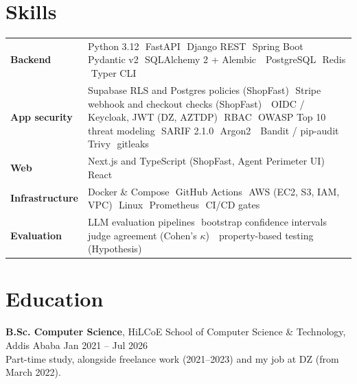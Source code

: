\documentclass[10pt,letterpaper]{article}
\newcommand{\sep}{\,\textperiodcentered\,}
\begin{document}
\section{Skills}
{\small{}
\begin{tabularx}{\linewidth}{@{}>{\RaggedRight}p{2.85cm}>{\RaggedRight\arraybackslash}X@{}}
\textbf{Backend} & Python 3.12 \sep FastAPI \sep Django REST \sep Spring Boot \sep Pydantic v2 \sep SQLAlchemy 2 + Alembic \sep
PostgreSQL \sep Redis \sep Typer CLI \\[1pt]
\textbf{App security} & Supabase RLS and Postgres policies (ShopFast) \sep Stripe webhook and checkout checks (ShopFast) \sep
OIDC / Keycloak, JWT (DZ, AZTDP) \sep RBAC \sep OWASP Top 10 \sep threat modeling \sep SARIF 2.1.0 \sep Argon2 \sep
Bandit / pip-audit \sep Trivy \sep gitleaks \\[1pt]
\textbf{Web} & Next.js and TypeScript (ShopFast, Agent Perimeter UI) \sep React \\[1pt]
\textbf{Infrastructure} & Docker \& Compose \sep GitHub Actions \sep AWS (EC2, S3, IAM, VPC) \sep Linux \sep Prometheus \sep CI/CD gates \\[1pt]
\textbf{Evaluation} & LLM evaluation pipelines \sep bootstrap confidence intervals \sep judge agreement (Cohen's $\kappa$) \sep
property-based testing (Hypothesis) \\
\end{tabularx}
}

\section{Education}
\textbf{B.Sc. Computer Science}, HiLCoE School of Computer Science \& Technology, Addis Ababa \hfill{\small Jan 2021 -- Jul 2026}\\
{\small Part-time study, alongside freelance work (2021--2023) and my job at DZ (from March 2022).}
\end{document}
